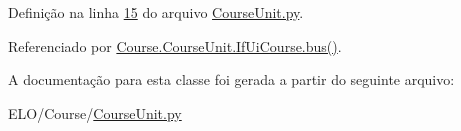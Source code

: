 Definição na linha \hyperlink{CourseUnit_8py_source_l00015}{15} do arquivo \hyperlink{CourseUnit_8py_source}{Course\-Unit.\-py}.



Referenciado por \hyperlink{classCourse_1_1CourseUnit_1_1IfUiCourse_a6d3c42a9777fe9dd395d9390aef47903}{Course.\-Course\-Unit.\-If\-Ui\-Course.\-bus()}.



A documentação para esta classe foi gerada a partir do seguinte arquivo\-:\begin{DoxyCompactItemize}
\item 
E\-L\-O/\-Course/\hyperlink{CourseUnit_8py}{Course\-Unit.\-py}\end{DoxyCompactItemize}

